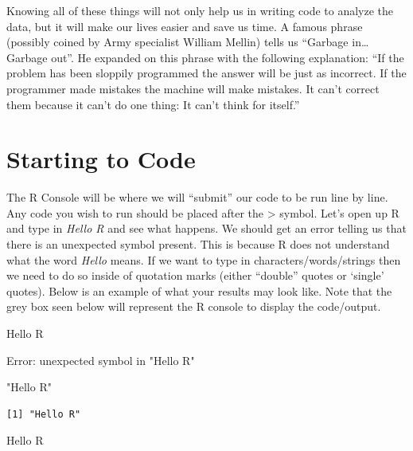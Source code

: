 \documentclass[
  letterpaper,
  DIV=11,
  numbers=noendperiod]{scrreprt}
\newenvironment{Shaded}{\begin{snugshade}}{\end{snugshade}}
\newcommand{\NormalTok}[1]{\textcolor[rgb]{0.00,0.23,0.31}{#1}}
\newcommand{\StringTok}[1]{\textcolor[rgb]{0.13,0.47,0.30}{#1}}
\begin{document}
Knowing all of these things will not only help us in writing code to
analyze the data, but it will make our lives easier and save us time. A
famous phrase (possibly coined by Army specialist William Mellin) tells
us ``Garbage in\ldots{} Garbage out''. He expanded on this phrase with
the following explanation: ``If the problem has been sloppily programmed
the answer will be just as incorrect. If the programmer made mistakes
the machine will make mistakes. It can't correct them because it can't
do one thing: It can't think for itself.''

\section{Starting to Code}\label{starting-to-code}

The R Console will be where we will ``submit'' our code to be run line
by line. Any code you wish to run should be placed after the
\textgreater{} symbol. Let's open up R and type in \emph{Hello R} and
see what happens. We should get an error telling us that there is an
unexpected symbol present. This is because R does not understand what
the word \emph{Hello} means. If we want to type in
characters/words/strings then we need to do so inside of quotation marks
(either ``double'' quotes or `single' quotes). Below is an example of
what your results may look like. Note that the grey box seen below will
represent the R console to display the code/output.

\begin{Shaded}
\begin{Highlighting}[]
\NormalTok{Hello R}
\end{Highlighting}
\end{Shaded}

{Error: unexpected symbol in "Hello R"}

\begin{Shaded}
\begin{Highlighting}[]
\StringTok{"Hello R"}
\end{Highlighting}
\end{Shaded}

\begin{verbatim}
[1] "Hello R"
\end{verbatim}

\begin{Shaded}
\begin{Highlighting}[]
\StringTok{\textquotesingle{}Hello R\textquotesingle{}}
\end{Highlighting}
\end{Shaded}
\end{document}
